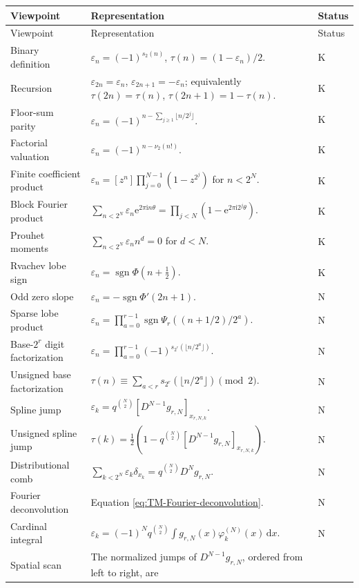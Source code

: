 \documentclass[11pt,oneside]{article}
\numberwithin{equation}{section}
\theoremstyle{definition}
\theoremstyle{remark}
\newcommand{\sgn}{\operatorname{sgn}}
\newcommand{\dd}{\,\mathrm d}
\newcommand{\e}{\mathrm e}
\newcommand{\ii}{\mathrm i}
\newcommand{\eps}{\varepsilon}
\newcommand{\statusknown}{\textcolor{deepviolet}{\textsf{K}}}
\newcommand{\statusnew}{\textcolor{provedgreen}{\textsf{N}}}
\begin{document}
\begin{longtable}{@{}p{}p{}p{}@{}}
\toprule
Viewpoint & Representation & Status\\
\midrule
\endfirsthead
\toprule
Viewpoint & Representation & Status\\
\midrule
\endhead
Binary definition &
$\eps_n=(-1)^{s_2(n)}$, $\tau(n)=(1-\eps_n)/2$. & \statusknown\\
Recursion &
$\eps_{2n}=\eps_n$, $\eps_{2n+1}=-\eps_n$; equivalently
$\tau(2n)=\tau(n)$, $\tau(2n+1)=1-\tau(n)$. & \statusknown\\
Floor-sum parity &
$\eps_n=(-1)^{n-\sum_{j\ge1}\lfloor n/2^j\rfloor}$. & \statusknown\\
Factorial valuation &
$\eps_n=(-1)^{n-\nu_2(n!)}$. & \statusknown\\
Finite coefficient product &
$\eps_n=[z^n]\prod_{j=0}^{N-1}(1-z^{2^j})$ for $n<2^N$. & \statusknown\\
Block Fourier product &
$\sum_{n<2^N}\eps_n\e^{2\pi\ii n\theta}
=\prod_{j<N}(1-\e^{2\pi\ii2^j\theta})$. & \statusknown\\
Prouhet moments &
$\sum_{n<2^N}\eps_nn^d=0$ for $d<N$. & \statusknown\\
Rvachev lobe sign &
$\eps_n=\sgn\Phi(n+\tfrac12)$. & \statusknown\\
Odd zero slope &
$\eps_n=-\sgn\Phi'(2n+1)$. & \statusnew\\
Sparse lobe product &
$\eps_n=\prod_{a=0}^{r-1}\sgn\Psi_r((n+1/2)/2^a)$. & \statusnew\\
Base-$2^r$ digit factorization &
$\eps_n=\prod_{a=0}^{r-1}(-1)^{s_{2^r}(\lfloor n/2^a\rfloor)}$. & \statusnew\\
Unsigned base factorization &
$\tau(n)\equiv\sum_{a<r}s_{2^r}(\lfloor n/2^a\rfloor)\pmod2$. & \statusnew\\
Spline jump &
$\eps_k=q^{\binom N2}[D^{N-1}g_{r,N}]_{x_{r,N,k}}$. & \statusnew\\
Unsigned spline jump &
$\tau(k)=\frac12(1-q^{\binom N2}[D^{N-1}g_{r,N}]_{x_{r,N,k}})$. & \statusnew\\
Distributional comb &
$\sum_{k<2^N}\eps_k\delta_{x_k}=q^{\binom N2}D^Ng_{r,N}$. & \statusnew\\
Fourier deconvolution &
Equation \eqref{eq:TM-Fourier-deconvolution}. & \statusnew\\
Cardinal integral &
$\eps_k=(-1)^Nq^{\binom N2}\int g_{r,N}(x)\varphi_k^{(N)}(x)\dd x$. & \statusnew\\
Spatial scan &
The normalized jumps of $D^{N-1}g_{r,N}$, ordered from left to right, are

\end{longtable}
\end{document}
